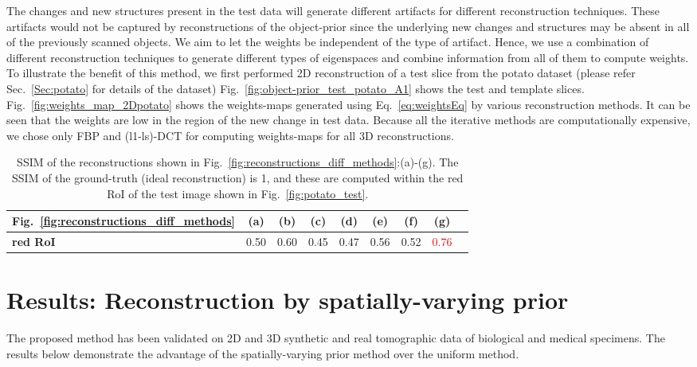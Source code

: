 \documentclass[journal]{IEEEtran}
\begin{document}
The changes and new structures present in the test data will generate
different artifacts for different reconstruction techniques. These
artifacts would not be captured by reconstructions of the object-prior
since the underlying new changes and structures may be absent in all
of the previously scanned objects. We aim to let the weights be
independent of the type of artifact. Hence, we use a combination of
different reconstruction techniques to generate different types of
eigenspaces and combine information from all of them to compute
weights. To illustrate the benefit of this method, we first performed
2D reconstruction of a test slice from the potato dataset (please
refer Sec.~\ref{Sec:potato} for details of the dataset)
Fig.~\ref{fig:object-prior_test_potato_A1} shows the test and template
slices. Fig.~\ref{fig:weights_map_2Dpotato} shows the weights-maps
generated using Eq.~\ref{eq:weightsEq} by various reconstruction
methods. It can be seen that the weights are low in the region of the
new change in test data. Because all the iterative methods are
computationally expensive, we chose only FBP and (l1-ls)-DCT for
computing weights-maps for all 3D reconstructions.
\begin{table}[!h]
  \centering
\caption{SSIM of the reconstructions shown in Fig.~\ref{fig:reconstructions_diff_methods}:(a)-(g). The SSIM of the ground-truth (ideal reconstruction) is 1, and these are computed within the red RoI of the test image shown in Fig.~\ref{fig:potato_test}.}
\begin{tabular}{|l|c|c|c|c|c|c|c|c|}
\hline
 Fig.~\ref{fig:reconstructions_diff_methods}  & \textbf{(a)} & \textbf{(b)} & \textbf{(c)} & \textbf{(d)} & \textbf{(e)} & \textbf{(f)} &  \textbf{(g)} \\\hline
\textbf{red RoI}  & 0.50 & 0.60  & 0.45 & 0.47 & 0.56 & 0.52 & \textcolor{red}{0.76} \\ \hline
\end{tabular}
\label{table:potato_2D_ssim}
\end{table}

\section{Results: Reconstruction by spatially-varying prior}
\label{sec:results_spatially_varying_prior}

The proposed method has been validated on 2D and 3D synthetic and real
tomographic data of biological and medical specimens. The results
below demonstrate the advantage of the spatially-varying prior
method over the uniform method.
\end{document}

